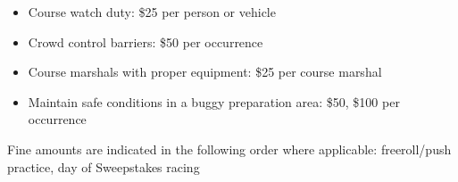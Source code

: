 \begin{appendices}
\begin{itemize}
			\item Course watch duty: \$25 per person or vehicle

			\item Crowd control barriers: \$50 per occurrence

			\item Course marshals with proper equipment: \$25 per course marshal
			
			\item Maintain safe conditions in a buggy preparation area: \$50, \$100 per occurrence

		\end{itemize}

		Fine amounts are indicated in the following order where applicable: freeroll/push practice, day of Sweepstakes racing
\end{appendices}
